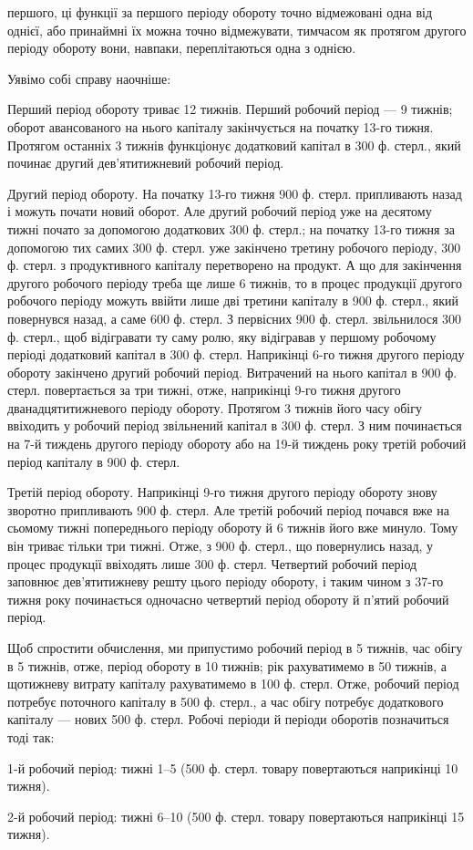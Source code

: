 \parcont{}  %
першого, ці функції за першого періоду обороту точно відмежовані одна
від однієї, або принаймні їх можна точно відмежувати, тимчасом як протягом
другого періоду обороту вони, навпаки, переплітаються одна з
однією.

Уявімо собі справу наочніше:

Перший період обороту триває 12 тижнів. Перший робочий період —
9 тижнів; оборот авансованого на нього капіталу закінчується на початку
13-го тижня. Протягом останніх 3 тижнів функціонує додатковий капітал
в 300 ф. стерл., який починає другий дев’ятитижневий робочий
період.

Другий період обороту. На початку 13-го тижня 900 ф. стерл. припливають
назад і можуть почати новий оборот. Але другий робочий
період уже на десятому тижні почато за допомогою додаткових 300 ф.
стерл.; на початку 13-го тижня за допомогою тих самих 300 ф. стерл.
уже закінчено третину робочого періоду, 300 ф. стерл. з продуктивного
капіталу перетворено на продукт. А що для закінчення другого робочого
періоду треба ще лише 6 тижнів, то в процес продукції другого робочого
періоду можуть ввійти лише дві третини капіталу в 900 ф. стерл.,
який повернувся назад, а саме 600 ф. стерл. З первісних 900 ф. стерл.
звільнилося 300 ф. стерл., щоб відігравати ту саму ролю, яку відігравав
у першому робочому періоді додатковий капітал в 300 ф. стерл. Наприкінці
6-го тижня другого періоду обороту закінчено другий робочий
період. Витрачений на нього капітал в 900 ф. стерл. повертається за три
тижні, отже, наприкінці 9-го тижня другого дванадцятитижневого періоду
обороту. Протягом 3 тижнів його часу обігу ввіходить у робочий період
звільнений капітал в 300 ф. стерл. З ним починається на 7-й тиждень
другого періоду обороту або на 19-й тиждень року третій робочий
період капіталу в 900 ф. стерл.

Третій період обороту. Наприкінці 9-го тижня другого періоду обороту
знову зворотно припливають 900 ф. стерл. Але третій робочий
період почався вже на сьомому тижні попереднього періоду обороту й
6 тижнів його вже минуло. Тому він триває тільки три тижні. Отже,
з 900 ф. стерл., що повернулись назад, у процес продукції ввіходять
лише 300 ф. стерл. Четвертий робочий період заповнює дев’ятитижневу
решту цього періоду обороту, і таким чином з 37-го тижня року починається
одночасно четвертий період обороту й п’ятий робочий період.

Щоб спростити обчислення, ми припустимо робочий період в 5 тижнів,
час обігу в 5 тижнів, отже, період обороту в 10 тижнів; рік рахуватимемо
в 50 тижнів, а щотижневу витрату капіталу рахуватимемо в 100 ф.
стерл. Отже, робочий період потребує поточного капіталу в 500 ф. стерл.,
а час обігу потребує додаткового капіталу — нових 500 ф. стерл. Робочі
періоди й періоди оборотів позначиться тоді так:

1-й робочий період: тижні 1--5 (500 ф. стерл. товару повертаються
наприкінці 10 тижня).

2-й робочий період: тижні 6--10 (500 ф. стерл. товару повертаються
наприкінці 15 тижня).
